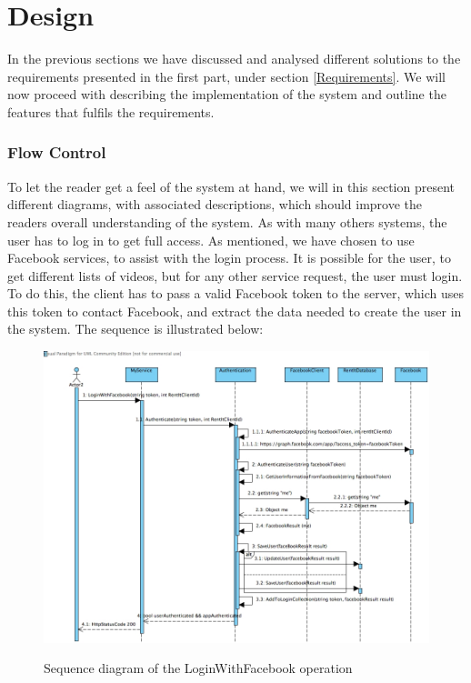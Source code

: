 \part{Design}
In the previous sections we have discussed and analysed different solutions to the requirements presented in the first part, under section \ref{Requirements}. We will now proceed with describing the implementation of the system and outline the features that fulfils the requirements.

\section{Flow Control}
To let the reader get a feel of the system at hand, we will in this section present different diagrams, with associated descriptions, which should improve the readers overall understanding of the system.
As with many others systems, the user has to log in to get full access. As mentioned, we have chosen to use Facebook services, to assist with the login process. It is possible for the user, to get different lists of videos, but for any other service request, the user must login. To do this, the client has to pass a valid Facebook token to the server, which uses this token to contact Facebook, and extract the data needed to create the user in the system. The sequence is illustrated below:

\begin{figure}[H]
\centering
\includegraphics[scale=0.35]{loginWithFacebook.jpg}
\label{loginwithfacebook}
\caption{Sequence diagram of the LoginWithFacebook operation}
\end{figure}


